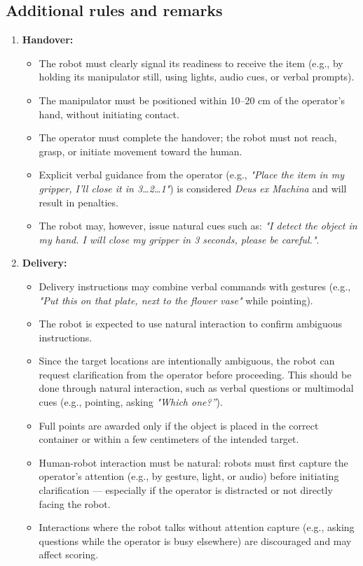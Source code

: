 \subsection*{Additional rules and remarks}
\begin{enumerate}[nosep]
	\item \textbf{Handover:}
	\begin{itemize}[nosep]
		\item The robot must clearly signal its readiness to receive the item (e.g., by holding its manipulator still, using lights, audio cues, or verbal prompts).
		\item The manipulator must be positioned within 10--20 cm of the operator's hand, without initiating contact.
		\item The operator must complete the handover; the robot must not reach, grasp, or initiate movement toward the human.
		\item Explicit verbal guidance from the operator (e.g., \textit{"Place the item in my gripper, I'll close it in 3…2…1"}) is considered \textit{Deus ex Machina} and will result in penalties.
		\item The robot may, however, issue natural cues such as: \textit{"I detect the object in my hand. I will close my gripper in 3 seconds, please be careful."}.
	\end{itemize}

	\item \textbf{Delivery:}
	\begin{itemize}[nosep]
		\item Delivery instructions may combine verbal commands with gestures (e.g., \textit{"Put this on that plate, next to the flower vase"} while pointing).
		\item The robot is expected to use natural interaction to confirm ambiguous instructions.
		\item Since the target locations are intentionally ambiguous, the robot can request clarification from the operator before proceeding. This should be done through natural interaction, such as verbal questions or multimodal cues (e.g., pointing, asking \textit{"Which one?”}).
		\item Full points are awarded only if the object is placed in the correct container or within a few centimeters of the intended target.
		\item Human-robot interaction must be natural: robots must first capture the operator's attention (e.g., by gesture, light, or audio) before initiating clarification — especially if the operator is distracted or not directly facing the robot.
		\item Interactions where the robot talks without attention capture (e.g., asking questions while the operator is busy elsewhere) are discouraged and may affect scoring.
	\end{itemize}
\end{enumerate}

